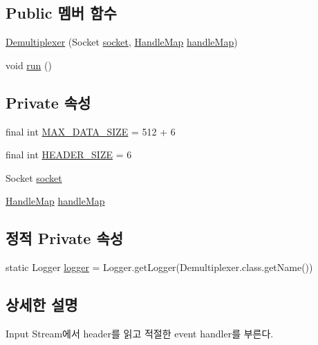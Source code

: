 \subsection*{Public 멤버 함수}
\begin{DoxyCompactItemize}
\item 
\hyperlink{classbasic_server_1_1_demultiplexer_ab8d7da48a98765e8d5025701e1781897}{Demultiplexer} (Socket \hyperlink{classbasic_server_1_1_demultiplexer_ae73d9106d863dd9c902a2a941619056b}{socket}, \hyperlink{classbasic_server_1_1_handle_map}{Handle\+Map} \hyperlink{classbasic_server_1_1_demultiplexer_a9faf12f00a74f61936cff837b03609bd}{handle\+Map})
\item 
void \hyperlink{classbasic_server_1_1_demultiplexer_a49f039cbe9f7654b720fcd9e53a0c432}{run} ()
\end{DoxyCompactItemize}
\subsection*{Private 속성}
\begin{DoxyCompactItemize}
\item 
final int \hyperlink{classbasic_server_1_1_demultiplexer_a22d173243d9c6e9b3715330181f2d891}{M\+A\+X\+\_\+\+D\+A\+T\+A\+\_\+\+S\+I\+Z\+E} = 512 + 6
\item 
final int \hyperlink{classbasic_server_1_1_demultiplexer_a43686b9c044fc363ba7a9eae1f79120f}{H\+E\+A\+D\+E\+R\+\_\+\+S\+I\+Z\+E} = 6
\item 
Socket \hyperlink{classbasic_server_1_1_demultiplexer_ae73d9106d863dd9c902a2a941619056b}{socket}
\item 
\hyperlink{classbasic_server_1_1_handle_map}{Handle\+Map} \hyperlink{classbasic_server_1_1_demultiplexer_a9faf12f00a74f61936cff837b03609bd}{handle\+Map}
\end{DoxyCompactItemize}
\subsection*{정적 Private 속성}
\begin{DoxyCompactItemize}
\item 
static Logger \hyperlink{classbasic_server_1_1_demultiplexer_afea28eb5eb1482f56ce6b661232767b1}{logger} = Logger.\+get\+Logger(Demultiplexer.\+class.\+get\+Name())
\end{DoxyCompactItemize}


\subsection{상세한 설명}
Input Stream에서 header를 읽고 적절한 event handler를 부른다. 

